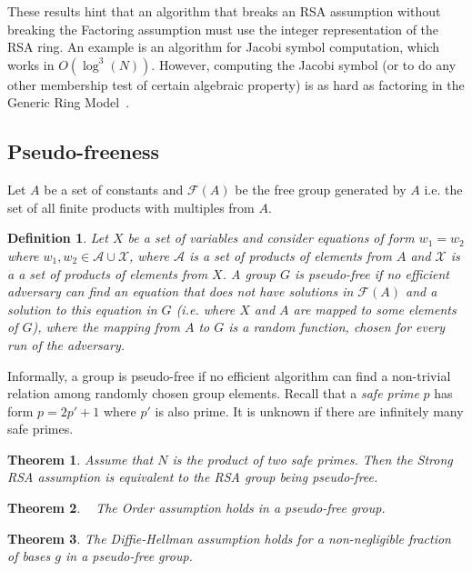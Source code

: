 \documentclass[a4paper]{article}
\newtheorem{definition}{Definition}
\newtheorem{theorem}{Theorem}
\begin{document}
These results hint that an algorithm that breaks an RSA assumption without breaking the Factoring assumption must use the integer representation of the RSA ring. An example is an algorithm for Jacobi symbol computation, which works in $O(\log^3(N))$. However, computing the Jacobi symbol (or to do any other membership test of certain algebraic property) is as hard as factoring in the Generic Ring Model~\cite{DBLP:journals/joc/JagerS13}.


\subsection{Pseudo-freeness}

Let $A$ be a set of constants and $\mathcal{F}(A)$ be the free group generated by $A$ i.e. the set of all finite products with multiples from $A$. 
\begin{definition}Let $X$ be a set of variables and consider equations of form $w_1 = w_2$ where $w_1,w_2\in\mathcal{A}\cup \mathcal{X}$, where $\mathcal{A}$ is a set of products of elements from $A$ and $\mathcal{X}$ is a a set of products of elements from $X$. A group $G$ is \emph{pseudo-free} if no efficient adversary can find an equation that does not have solutions in $\mathcal{F}(A)$ and a solution to this equation in $G$ (i.e. where $X$ and $A$ are mapped to some elements of $G$), where the mapping from $A$ to $G$ is a random function, chosen for every run of the adversary.
\end{definition}

Informally, a group is pseudo-free if no efficient algorithm can find a non-trivial relation among randomly chosen group elements. Recall that a \emph{safe prime} $p$ has form $p=2p'+1$ where $p'$ is also prime. It is unknown if there are infinitely many safe primes.

\begin{theorem}\cite{DBLP:conf/tcc/Rivest04,DBLP:conf/eurocrypt/Micciancio05}
Assume that $N$ is the product of two safe primes. Then the Strong RSA assumption is equivalent to the RSA group being pseudo-free.
\end{theorem}

\begin{theorem}~\cite{DBLP:conf/tcc/Rivest04} The Order assumption holds in a pseudo-free group.
\end{theorem}

\begin{theorem}\cite{DBLP:journals/ijisec/HasegawaIST09}
The Diffie-Hellman assumption holds for a non-negligible fraction of bases $g$ in a pseudo-free group.
\end{theorem}
\end{document}
